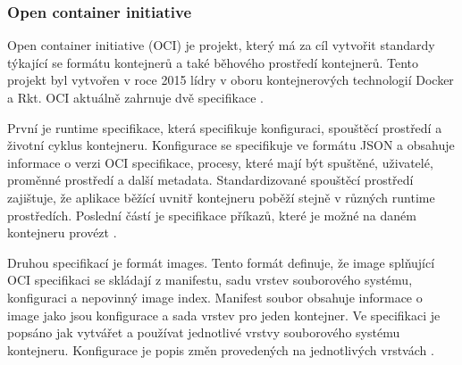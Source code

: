 \subsubsection{Open container initiative}
Open container initiative (OCI) je projekt, který má za cíl vytvořit standardy týkající se formátu kontejnerů a také běhového prostředí kontejnerů. Tento projekt byl vytvořen v roce 2015 lídry v oboru kontejnerových technologií Docker a Rkt. OCI aktuálně zahrnuje dvě specifikace \cite{oci}. \par
První je runtime specifikace, která specifikuje konfiguraci, spouštěcí prostředí a životní cyklus kontejneru. Konfigurace se specifikuje ve formátu JSON a obsahuje informace o verzi OCI specifikace, procesy, které mají být spuštěné, uživatelé, proměnné prostředí a další metadata. Standardizované spouštěcí prostředí zajištuje, že aplikace běžící uvnitř kontejneru poběží stejně v různých runtime prostředích. Poslední částí je specifikace příkazů, které je možné na daném kontejneru provézt \cite{runtimespec}.\par
Druhou specifikací je formát images. Tento formát definuje, že image splňující OCI specifikaci se skládají z manifestu, sadu vrstev souborového systému, konfiguraci a \linebreak nepovinný image index. Manifest soubor obsahuje informace o image jako jsou konfigurace a sada vrstev pro jeden kontejner. Ve specifikaci je popsáno jak vytvářet a používat jednotlivé vrstvy souborového systému kontejneru. Konfigurace je popis změn provedených na jednotlivých vrstvách \cite{imagespec}. 

